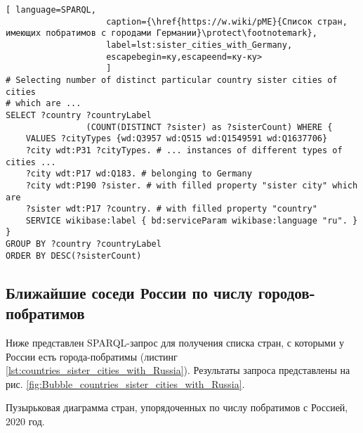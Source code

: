 \begin{lstlisting}[ language=SPARQL, 
                    caption={\href{https://w.wiki/pME}{Список стран, имеющих побратимов с городами Германии}\protect\footnotemark},
                    label=lst:sister_cities_with_Germany, 
                    escapebegin=ку,escapeend=ку-ку>
                    ]
# Selecting number of distinct particular country sister cities of cities 
# which are ...
SELECT ?country ?countryLabel 
				(COUNT(DISTINCT ?sister) as ?sisterCount) WHERE {                                                          
	VALUES ?cityTypes {wd:Q3957 wd:Q515 wd:Q1549591 wd:Q1637706}
	?city wdt:P31 ?cityTypes. # ... instances of different types of cities ...
	?city wdt:P17 wd:Q183. # belonging to Germany  
	?city wdt:P190 ?sister. # with filled property "sister city" which are
	?sister wdt:P17 ?country. # with filled property "country"
	SERVICE wikibase:label { bd:serviceParam wikibase:language "ru". }
}
GROUP BY ?country ?countryLabel
ORDER BY DESC(?sisterCount)\end{lstlisting}

\subsection{Ближайшие соседи России по числу городов-побратимов}

Ниже представлен SPARQL-запрос для получения списка стран, с которыми у России есть города-побратимы (листинг \ref{lst:countries_sister_cities_with_Russia}). Результаты запроса представлены на рис. \ref{fig:Bubble_countries_sister_cities_with_Russia}.

\begin{marginfigure}[0.0cm]
{
\setlength{\fboxsep}{0pt}%
\setlength{\fboxrule}{1pt}%
%
}
  \caption{Пузырьковая диаграмма стран, упорядоченных по числу побратимов с Россией, 2020 год.}%
  \label{fig:Bubble_countries_sister_cities_with_Russia}%
\end{marginfigure}


